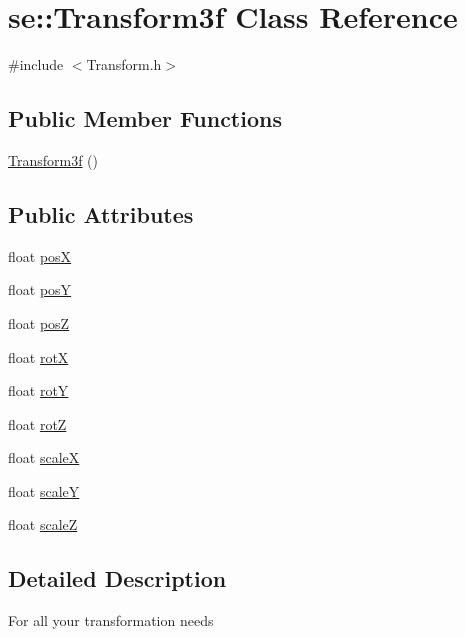 \hypertarget{classse_1_1_transform3f}{}\section{se\+:\+:Transform3f Class Reference}
\label{classse_1_1_transform3f}


{\ttfamily \#include $<$Transform.\+h$>$}

\subsection*{Public Member Functions}
\begin{DoxyCompactItemize}
\item 
\mbox{\hyperlink{classse_1_1_transform3f_ad3b4895905ce0ca7e62fdf41044b7afb}{Transform3f}} ()
\end{DoxyCompactItemize}
\subsection*{Public Attributes}
\begin{DoxyCompactItemize}
\item 
float \mbox{\hyperlink{classse_1_1_transform3f_ad2c0078eef5e4b87361f764ad9ac4f84}{posX}}
\item 
float \mbox{\hyperlink{classse_1_1_transform3f_a3bc9b7dab3224ff12df803c157b86d3d}{posY}}
\item 
float \mbox{\hyperlink{classse_1_1_transform3f_a2429d1b09776ebf7737706bd7f57ab3c}{posZ}}
\item 
float \mbox{\hyperlink{classse_1_1_transform3f_a2ee9344ae3d32a543f40212dd8ee4a9c}{rotX}}
\item 
float \mbox{\hyperlink{classse_1_1_transform3f_a19689d88306a019419d31feeae7ea7b6}{rotY}}
\item 
float \mbox{\hyperlink{classse_1_1_transform3f_a454decdb9bcd426832064f69cfabcd93}{rotZ}}
\item 
float \mbox{\hyperlink{classse_1_1_transform3f_af87cb468268b871f516059ab9f84035f}{scaleX}}
\item 
float \mbox{\hyperlink{classse_1_1_transform3f_abc893c842f0fcbfe910b48b38e56a241}{scaleY}}
\item 
float \mbox{\hyperlink{classse_1_1_transform3f_af25deb0eb4f11f5f3e1f369a86bb3a91}{scaleZ}}
\end{DoxyCompactItemize}


\subsection{Detailed Description}
For all your transformation needs 

